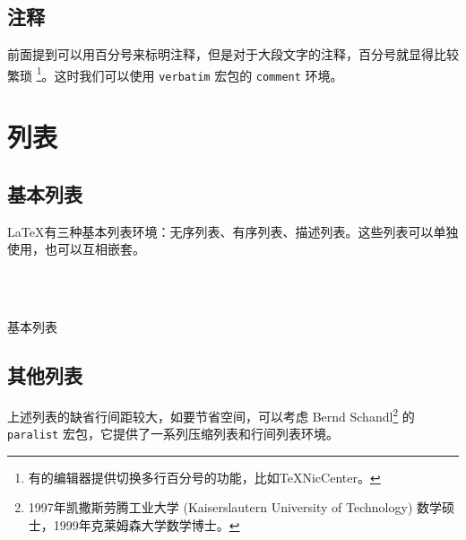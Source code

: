 \subsection{注释}
前面提到可以用百分号来标明注释，但是对于大段文字的注释，百分号就显得比较繁琐 \footnote{有的编辑器提供切换多行百分号的功能，比如TeXNicCenter。}。这时我们可以使用 \texttt{verbatim} 宏包的 \texttt{comment} 环境。

\begin{Code}[]
\begin{comment}
...
\end{comment}
\end{Code}

\section{列表}\label{sec:list}

\subsection{基本列表}

\LaTeX 有三种基本列表环境：无序列表、有序列表、描述列表。这些列表可以单独使用，也可以互相嵌套。

\begin{example}[h]
\\
\\
\caption{基本列表}
\end{example}

\subsection{其他列表}

上述列表的缺省行间距较大，如要节省空间，可以考虑 Bernd Schandl\indexSchandl{}\footnote{1997年凯撒斯劳腾工业大学 (Kaiserslautern University of Technology) 数学硕士，1999年克莱姆森大学数学博士。} 的 \texttt{paralist} 宏包，它提供了一系列压缩列表和行间列表环境。

